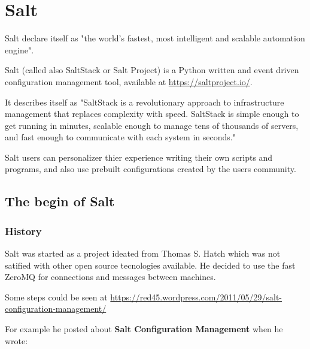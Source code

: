 \documentclass[12pt,a4paper,openright,twoside]{book}
\begin{document}




\chapter{Salt}
Salt declare itself as "the world's fastest, most intelligent and scalable automation engine"\cite{saltDocAbout}.


Salt (called also SaltStack or Salt Project) is a Python written and event driven configuration management tool, available at \url{https://saltproject.io/}.


It describes itself as "SaltStack is a revolutionary approach to infrastructure management that replaces complexity with speed. SaltStack is simple enough to get running in minutes, scalable enough to manage tens of thousands of servers, and fast enough to communicate with each system in seconds."\cite{saltDocStart}


Salt users can personalizer thier experience writing their own scripts and programs, and also use prebuilt configurations created by the users community.

\section{The begin of Salt}

\subsection{History}
Salt was started as a project ideated from Thomas S. Hatch which was not satified with other open source tecnologies available\cite{saltFloss}. He decided to use the fast ZeroMQ for connections and messages between machines.

Some steps could be seen at \url{https://red45.wordpress.com/2011/05/29/salt-configuration-management/}


For example he posted about \textbf{Salt Configuration Management} when he wrote:
\end{document}
